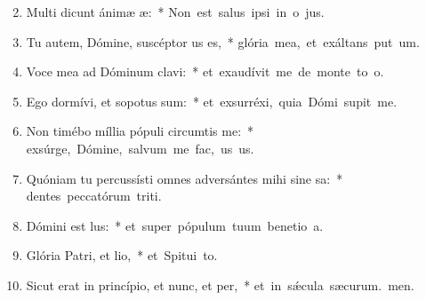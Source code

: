 \begin{flushleft}
\begin{enumerate}[leftmargin=*]
\setcounter{enumi}{1}

\item Multi dicunt ánimæ æ:~* \mbox{Non est salus ipsi in o jus.}

\item Tu autem, Dómine, suscéptor us es,~* \mbox{glória mea, et exáltans put um.}

\item Voce mea ad Dóminum clavi:~* \mbox{et exaudívit me de monte to o.}

\item Ego dormívi, et sopotus sum:~* \mbox{et exsurréxi, quia Dómi supit me.}

\item Non timébo míllia pópuli circumtis me:~* \mbox{exsúrge, Dómine, salvum me fac, us us.}

\item Quóniam tu percussísti omnes adversántes mihi sine sa:~* \mbox{dentes peccatórum triti.}

\item Dómini est lus:~* \mbox{et super pópulum tuum benetio a.}

\item Glória Patri, et lio,~* \mbox{et Spitui to.}

\item Sicut erat in princípio, et nunc, et per,~* \mbox{et in s\'{\ae}cula sæcurum. men.}

\end{enumerate}
\end{flushleft}

